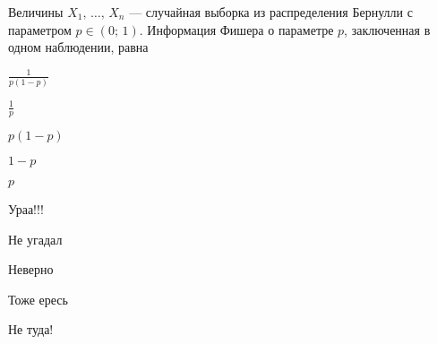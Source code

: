 
\begin{question}
Величины \(X_1, \, \ldots, \, X_n\) — случайная выборка из
распределения Бернулли с параметром \(p \in (0;\,1)\). Информация Фишера
о параметре \(p\), заключенная в одном наблюдении, равна
\begin{answerlist}
  \item \(\frac{1}{p(1-p)}\)
  \item \(\frac{1}{p}\)
  \item \(p(1-p)\)
  \item \(1 - p\)
  \item \(p\)
\end{answerlist}
\end{question}

\begin{solution}
\begin{answerlist}
  \item Ураа!!!
  \item Не угадал
  \item Неверно
  \item Тоже ересь
  \item Не туда!
\end{answerlist}
\end{solution}


